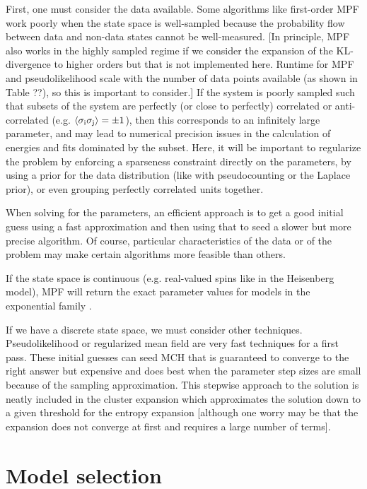 \documentclass[aps,prl,twocolumn]{revtex4-1}
\begin{document}
First, one must consider the data available. Some algorithms like first-order MPF work poorly when the state space is well-sampled because the probability flow between data and non-data states cannot be well-measured. [In principle, MPF also works in the highly sampled regime if we consider the expansion of the KL-divergence to higher orders but that is not implemented here. Runtime for MPF and pseudolikelihood scale with the number of data points available (as shown in Table ??), so this is important to consider.]
If the system is poorly sampled such that subsets of the system are perfectly (or close to perfectly) correlated or anti-correlated (e.g. $\left<\sigma_{\rm i}\sigma_{\rm j}\right>=\pm1$), then this corresponds to an infinitely large parameter, and may lead to numerical precision issues in the calculation of energies and fits dominated by the subset. Here, it will be important to regularize the problem by enforcing a sparseness constraint directly on the parameters, by using a prior for the data distribution (like with pseudocounting or the Laplace prior), or even grouping perfectly correlated units together.

When solving for the parameters, an efficient approach is to get a good initial guess using a fast approximation and then using that to seed a slower but more precise algorithm. Of course, particular characteristics of the data or of the problem may make certain algorithms more feasible than others.

If the state space is continuous (e.g. real-valued spins like in the Heisenberg model), MPF will return the exact parameter values for models in the exponential family \cite{SohlDickstein:2011im}.

If we have a discrete state space, we must consider other techniques. Pseudolikelihood or regularized mean field are very fast techniques for a first pass. These initial guesses can seed MCH that is guaranteed to converge to the right answer but expensive and does best when the parameter step sizes are small because of the sampling approximation. This stepwise approach to the solution is neatly included in the cluster expansion which approximates the solution down to a given threshold for the entropy expansion [although one worry may be that the expansion does not converge at first and requires a large number of terms]. 

\section{Model selection}
\end{document}

